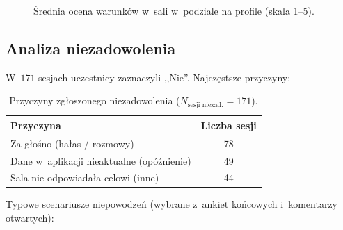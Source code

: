 \documentclass[14pt,a4paper]{extarticle}
\begin{document}
\begin{figure}[H]
    \centering
    \caption{Średnia ocena warunków w~sali w~podziale na profile (skala 1--5).}
    \label{fig:ocena_bar}
\end{figure}

\subsection{Analiza niezadowolenia}

W~$171$ sesjach uczestnicy zaznaczyli ,,Nie''. Najczęstsze przyczyny:

\begin{table}[H]
    \centering
    \caption{Przyczyny zgłoszonego niezadowolenia ($N_{\text{sesji niezad.}} = 171$).}
    \label{tab:przyczyny5}
    \begin{tabular}{|p{8cm}|c|}
        \hline
        \textbf{Przyczyna} & \textbf{Liczba sesji} \\
        \hline
        Za głośno (hałas / rozmowy) & 78 \\
        \hline
        Dane w~aplikacji nieaktualne (opóźnienie) & 49 \\
        \hline
        Sala nie odpowiadała celowi (inne) & 44 \\
        \hline
    \end{tabular}
\end{table}

Typowe scenariusze niepowodzeń (wybrane z~ankiet końcowych i~komentarzy otwartych):
\end{document}
